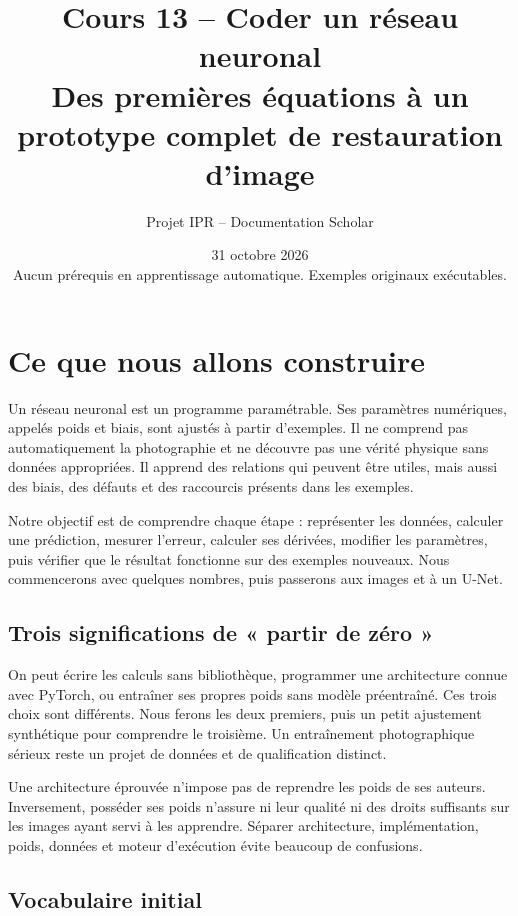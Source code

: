 \documentclass[12pt,a4paper,oneside]{report}
\title{Cours 13 -- Coder un réseau neuronal\\\large Des premières équations à un prototype complet de restauration d'image}
\author{Projet IPR -- Documentation Scholar}
\date{31 octobre 2026\\\small Aucun prérequis en apprentissage automatique. Exemples originaux exécutables.}
\begin{document}
\maketitle
\tableofcontents

\chapter{Ce que nous allons construire}

Un réseau neuronal est un programme paramétrable. Ses paramètres numériques,
appelés poids et biais, sont ajustés à partir d'exemples. Il ne comprend pas
automatiquement la photographie et ne découvre pas une vérité physique sans
données appropriées. Il apprend des relations qui peuvent être utiles, mais
aussi des biais, des défauts et des raccourcis présents dans les exemples.

Notre objectif est de comprendre chaque étape : représenter les données,
calculer une prédiction, mesurer l'erreur, calculer ses dérivées, modifier les
paramètres, puis vérifier que le résultat fonctionne sur des exemples nouveaux.
Nous commencerons avec quelques nombres, puis passerons aux images et à un U-Net.

\section{Trois significations de « partir de zéro »}

On peut écrire les calculs sans bibliothèque, programmer une architecture connue
avec PyTorch, ou entraîner ses propres poids sans modèle préentraîné. Ces trois
choix sont différents. Nous ferons les deux premiers, puis un petit ajustement
synthétique pour comprendre le troisième. Un entraînement photographique sérieux
reste un projet de données et de qualification distinct.

Une architecture éprouvée n'impose pas de reprendre les poids de ses auteurs.
Inversement, posséder ses poids n'assure ni leur qualité ni des droits suffisants
sur les images ayant servi à les apprendre. Séparer architecture, implémentation,
poids, données et moteur d'exécution évite beaucoup de confusions.

\section{Vocabulaire initial}
\end{document}
